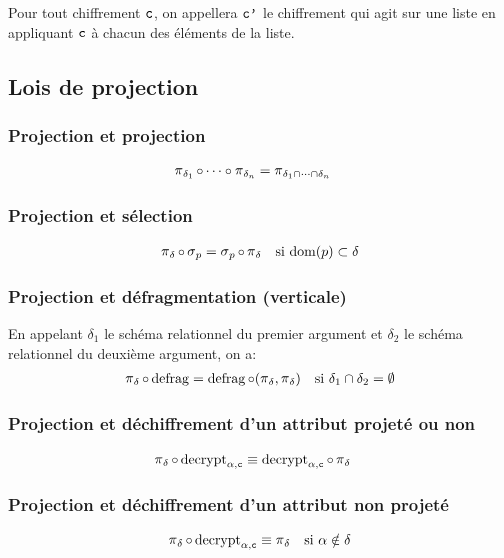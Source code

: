 Pour tout chiffrement $\text{\ttfamily c}$,
on appellera $\text{\ttfamily c'}$
le chiffrement qui agit sur une liste en appliquant
$\text{\ttfamily c}$ à chacun des éléments de la liste.

\subsection*{Lois de projection}
\subsubsection*{Projection et projection}
\begin{align*}
\proj_{\delta_1}\circ \dots \circ \proj_{\delta_n} 
& = \proj_{\delta_1 \cap \dots \cap \delta_n}
\end{align*}

\subsubsection*{Projection et sélection}
\begin{align*}
\projDelta \circ \selP
& = \selP \circ \projDelta
& \text{si $\dom(p) \subset \delta$}
\end{align*}


\subsubsection*{Projection et défragmentation (verticale)}
En appelant $\delta_1$ le schéma relationnel du premier
argument et $\delta_2$ le schéma relationnel du deuxième
argument, on a:
\begin{align*}
\projDelta \circ \defrag
& = \defrag \circ (\projDelta, \projDelta)
& \text{si $\delta_1 \cap \delta_2 = \emptyset$}
\end{align*}
\subsubsection*{Projection et déchiffrement d'un attribut projeté ou non}
\begin{align*}
\projDelta \circ \decryptArgs{\alpha}{c}
& \equiv \decryptArgs{\alpha}{c} \circ \projDelta
\end{align*}
\subsubsection*{Projection et déchiffrement d'un attribut non projeté}
\begin{align*}
\projDelta \circ \decryptArgs{\alpha}{c}
& \equiv \projDelta
&\text{si $\alpha \notin \delta$} 
\end{align*}
